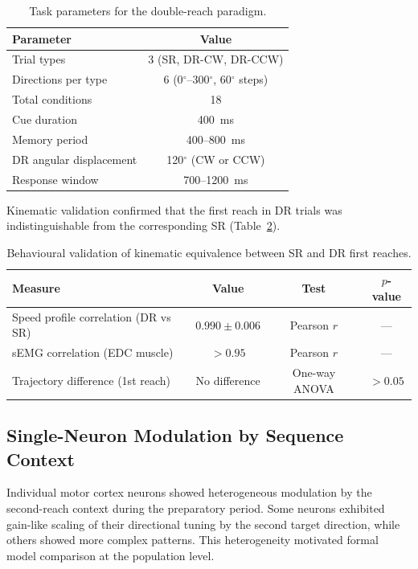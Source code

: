 \documentclass[11pt]{article}
\begin{document}
\begin{table}[H]
\centering
\caption{Task parameters for the double-reach paradigm.}
\label{tab:task}
\begin{tabular}{@{}lc@{}}
\toprule
Parameter & Value \\
\midrule
Trial types & 3 (SR, DR-CW, DR-CCW) \\
Directions per type & 6 (0$^\circ$--300$^\circ$, 60$^\circ$ steps) \\
Total conditions & 18 \\
Cue duration & 400~ms \\
Memory period & 400--800~ms \\
DR angular displacement & 120$^\circ$ (CW or CCW) \\
Response window & 700--1200~ms \\
\bottomrule
\end{tabular}
\end{table}

Kinematic validation confirmed that the first reach in DR trials was indistinguishable from the corresponding SR (Table~\ref{tab:kinematics}).

\begin{table}[H]
\centering
\caption{Behavioural validation of kinematic equivalence between SR and DR first reaches.}
\label{tab:kinematics}
\begin{tabular}{@{}lccc@{}}
\toprule
Measure & Value & Test & $p$-value \\
\midrule
Speed profile correlation (DR vs SR) & $0.990 \pm 0.006$ & Pearson $r$ & --- \\
sEMG correlation (EDC muscle) & $> 0.95$ & Pearson $r$ & --- \\
Trajectory difference (1st reach) & No difference & One-way ANOVA & $> 0.05$ \\
\bottomrule
\end{tabular}
\end{table}

\subsection{Single-Neuron Modulation by Sequence Context}

Individual motor cortex neurons showed heterogeneous modulation by the second-reach context during the preparatory period. Some neurons exhibited gain-like scaling of their directional tuning by the second target direction, while others showed more complex patterns. This heterogeneity motivated formal model comparison at the population level.
\end{document}
